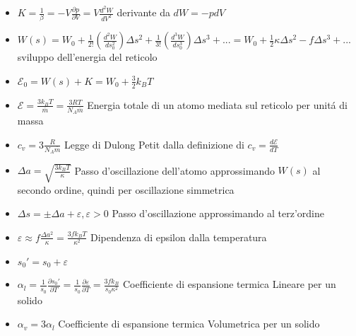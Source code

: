 \documentclass[a4paper]{article}
\begin{document}
\begin{itemize}
	\item $K=\frac{1}{\beta}=-V \frac{\partial p}{\partial V} = V\frac{d^2W}{dV^2}$ derivante da $dW=-pdV$
	\item $W(s)=W_0+\frac{1}{2!}(\frac{d^2W}{ds_0^2})\Delta s^2+\frac{1}{3!}(\frac{d^3W}{ds_0^3}) \Delta s^3+...=W_0+\frac{1}{2}\kappa\Delta s^2-f \Delta s^3+...$ sviluppo dell'energia del reticolo
	\item $\mathcal{E}_0 =W(s)+ K =W_0+\frac{3}{2}k_BT$ 
	\item $\mathcal{E} = \frac{3k_BT}{\overline{m}} = \frac{3RT}{N_A \overline{m}}$ Energia totale di un atomo mediata sul reticolo per unit\'a di massa
	\item $c_v = 3 \frac{R}{N_A \overline{m}}$ Legge di Dulong Petit dalla definizione di $c_v=\frac{d \mathcal{E}}{dT}$
	\item $\Delta a = \sqrt{\frac{3k_BT}{\kappa}}$ Passo d'oscillazione dell'atomo approssimando $W(s)$ al secondo ordine, quindi per oscillazione simmetrica
	\item $\Delta s = \pm \Delta a + \varepsilon, \varepsilon > 0$ Passo d'oscillazione approssimando al terz'ordine
	\item $\varepsilon \approx f \frac{\Delta a^2}{\kappa} = \frac{3fk_BT}{\kappa^2}$ Dipendenza di epsilon dalla temperatura
	\item $s_0'= s_0 + \varepsilon$
	\item $\alpha_l = \frac{1}{s_0} \frac{\partial s_0'}{\partial T}  = \frac{1}{s_0} \frac{\partial \varepsilon}{\partial T} = \frac{3fk_B}{s_0\kappa^2}$ Coefficiente di espansione termica Lineare per un solido
	\item $\alpha_v = 3\alpha_l$ Coefficiente di espansione termica Volumetrica per un solido
\end{itemize}
\end{document}
